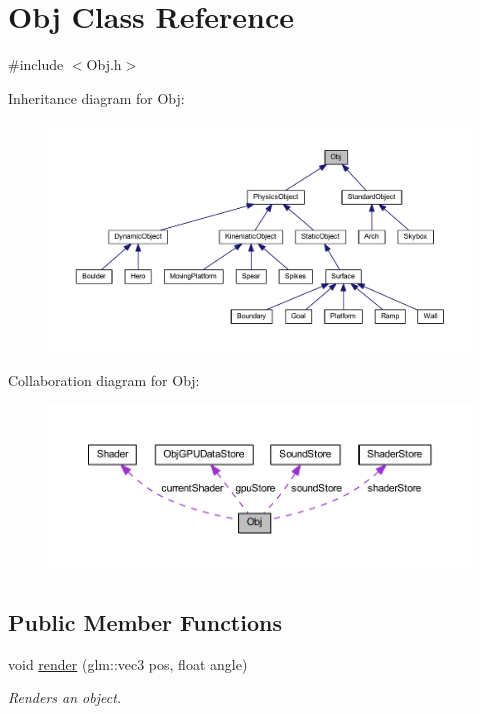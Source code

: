 \hypertarget{class_obj}{}\section{Obj Class Reference}
\label{class_obj}


{\ttfamily \#include $<$Obj.\+h$>$}



Inheritance diagram for Obj\+:
\nopagebreak
\begin{figure}[H]
\begin{center}
\leavevmode
\includegraphics[width=350pt]{class_obj__inherit__graph}
\end{center}
\end{figure}


Collaboration diagram for Obj\+:
\nopagebreak
\begin{figure}[H]
\begin{center}
\leavevmode
\includegraphics[width=350pt]{class_obj__coll__graph}
\end{center}
\end{figure}
\subsection*{Public Member Functions}
\begin{DoxyCompactItemize}
\item 
void \hyperlink{class_obj_a710c7db836923b39447b6ff05dba82d6}{render} (glm\+::vec3 pos, float angle)
\begin{DoxyCompactList}\small\item\em Renders an object. \end{DoxyCompactList}\end{DoxyCompactItemize}

